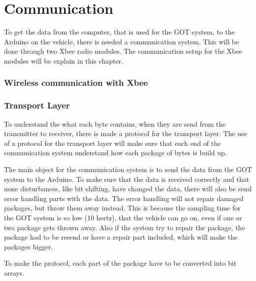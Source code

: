 \chapter{Communication}
To get the data from the computer, that is used for the GOT system, to the Arduino on the vehicle, there is needed a communication system. This will be done through two Xbee radio modules. The communication setup for the Xbee modules will be explain in this chapter.

\subsection{Wireless communication with Xbee}




\subsection{Transport Layer}
To understand the what each byte contains, when they are send from the transmitter to receiver, there is made a protocol for the transport layer. The use of a protocol for the transport layer will make sure that each end of the communication system understand how each package of bytes is build up.

The main object for the communication system is to send the data from the GOT system to the Arduino. To make sure that the data is received correctly and that none disturbances, like bit shifting, have changed the data, there will also be send error handling parts with the data. The error handling will not repair damaged packages, but throw them away instead. This is because the sampling time for the GOT system is so low (10 hertz), that the vehicle can go on, even if one or two package gets thrown away. Also if the system try to repair the package, the package had to be resend or have a repair part included, which will make the packages bigger.

To make the protocol, each part of the package have to be converted into bit arrays.

